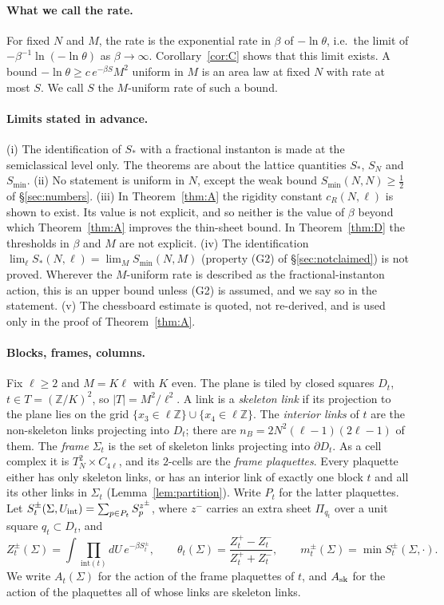 \documentclass[11pt,a4paper]{article}
\theoremstyle{definition}
\theoremstyle{remark}
\begin{document}
\paragraph{What we call the rate.}
For fixed $N$ and $M$, the rate is the exponential rate in $\beta$ of $-\ln\theta$, i.e.\ the limit of $-\beta^{-1}\ln(-\ln\theta)$ as $\beta\to\infty$.
Corollary~\ref{cor:C} shows that this limit exists.
A bound $-\ln\theta\ge c\,e^{-\beta S}M^2$ uniform in $M$ is an area law at fixed $N$ with rate at most $S$.
We call $S$ the $M$-uniform rate of such a bound.

\paragraph{Limits stated in advance.}
(i) The identification of $S_*$ with a fractional instanton is made at the semiclassical level only. The theorems are about the lattice quantities $S_*$, $S_N$ and $S_{\min}$.
(ii) No statement is uniform in $N$, except the weak bound $S_{\min}(N,N)\ge\frac12$ of \S\ref{sec:numbers}.
(iii) In Theorem~\ref{thm:A} the rigidity constant $c_R(N,\ell)$ is shown to exist. Its value is not explicit, and so neither is the value of $\beta$ beyond which Theorem~\ref{thm:A} improves the thin-sheet bound. In Theorem~\ref{thm:D} the thresholds in $\beta$ and $M$ are not explicit.
(iv) The identification $\lim_\ell S_*(N,\ell)=\lim_MS_{\min}(N,M)$ (property (G2) of \S\ref{sec:notclaimed}) is not proved. Wherever the $M$-uniform rate is described as the fractional-instanton action, this is an upper bound unless (G2) is assumed, and we say so in the statement.
(v) The chessboard estimate is quoted, not re-derived, and is used only in the proof of Theorem~\ref{thm:A}.

\paragraph{Blocks, frames, columns.}
Fix $\ell\ge2$ and $M=K\ell$ with $K$ even.
The plane is tiled by closed squares $D_t$, $t\in T=(\mathbb{Z}/K)^2$, so $|T|=M^2/\ell^2$.
A link is a \emph{skeleton link} if its projection to the plane lies on the grid $\{x_3\in\ell\mathbb{Z}\}\cup\{x_4\in\ell\mathbb{Z}\}$.
The \emph{interior links} of $t$ are the non-skeleton links projecting into $D_t$; there are $n_B=2N^2(\ell-1)(2\ell-1)$ of them.
The \emph{frame} $\Sigma_t$ is the set of skeleton links projecting into $\partial D_t$.
As a cell complex it is $T^2_N\times C_{4\ell}$, and its $2$-cells are the \emph{frame plaquettes}.
Every plaquette either has only skeleton links, or has an interior link of exactly one block $t$ and all its other links in $\Sigma_t$ (Lemma~\ref{lem:partition}).
Write $P_t$ for the latter plaquettes.
Let $S^\pm_t(\Sigma,U_{\rm int})=\sum_{p\in P_t}S^{z^\pm}_p$, where $z^-$ carries an extra sheet $\Pi_{q_t}$ over a unit square $q_t\subset D_t$, and
\[ Z^\pm_t(\Sigma)=\int\prod_{\mathrm{int}(t)}dU\,e^{-\beta S^\pm_t},\qquad \theta_t(\Sigma)=\frac{Z^+_t-Z^-_t}{Z^+_t+Z^-_t},\qquad m^\pm_t(\Sigma)=\min S^\pm_t(\Sigma,\cdot). \]
We write $A_t(\Sigma)$ for the action of the frame plaquettes of $t$, and $A_{\rm sk}$ for the action of the plaquettes all of whose links are skeleton links.
\end{document}
